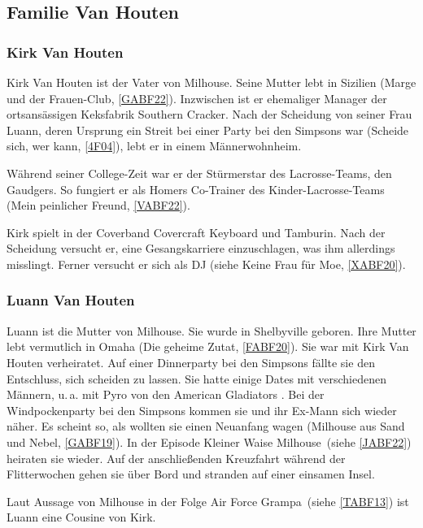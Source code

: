 {\subsection{Familie Van Houten}
 
\subsubsection{Kirk Van Houten}\label{KirkVanHouten}
Kirk Van Houten ist der Vater von Milhouse. Seine Mutter lebt in Sizilien (\glqq Marge und der Frauen-Club\grqq , \ref{GABF22}). Inzwischen ist er ehemaliger Manager der ortsansässigen Keksfabrik \glqq Southern Cracker\grqq . Nach der Scheidung von seiner Frau Luann, deren Ursprung ein Streit bei einer Party bei den Simpsons war (\glqq Scheide sich, wer kann\grqq , \ref{4F04}), lebt er in einem Männer\-wohn\-heim.

Während seiner College-Zeit war er der Stürmerstar des Lacrosse-Teams, den \glqq Gaudgers\grqq. So fungiert er als Homers Co-Trainer des Kinder-Lacrosse-Teams (\glqq Mein peinlicher Freund\grqq , \ref{VABF22}).

Kirk spielt in der Coverband Covercraft Keyboard und Tamburin. Nach der Scheidung versucht er, eine Gesangskarriere einzuschlagen, was ihm allerdings misslingt. Ferner versucht er sich als DJ (siehe \glqq Keine Frau für Moe\grqq, \ref{XABF20}).

\subsubsection{Luann Van Houten}\label{LuannVanHouten}
Luann ist die Mutter von Milhouse. Sie wurde in Shelbyville geboren. Ihre Mutter lebt vermutlich in Omaha (\glqq Die geheime Zutat\grqq , \ref{FABF20}). Sie war mit Kirk Van Houten verheiratet. Auf einer Dinnerparty bei den Simpsons fällte sie den Entschluss, sich scheiden zu lassen. Sie hatte einige Dates mit verschiedenen Männern, u.\,a. mit Pyro von den American Gladiators \cite{SpringfieldAt}. Bei der Windpockenparty bei den Simpsons kommen sie und ihr Ex-Mann sich wieder näher. Es scheint so, als wollten sie einen Neuanfang wagen (\glqq Milhouse aus Sand und Nebel\grqq , \ref{GABF19}). In der Episode \glqq Kleiner Waise Milhouse\grqq\ (siehe \ref{JABF22}) heiraten sie wieder. Auf der anschließenden Kreuzfahrt während der Flitterwochen gehen sie über Bord und stranden auf einer einsamen Insel.

Laut Aussage von Milhouse in der Folge \glqq Air Force Grampa\grqq\ (siehe \ref{TABF13}) ist Luann eine Cousine von Kirk.

}
